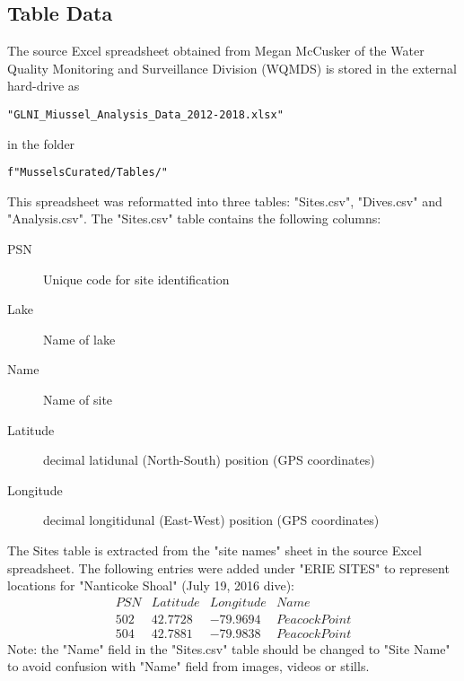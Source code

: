 \documentclass[11pt]{article} %
\begin{document}
\subsection{Table Data}

The source Excel spreadsheet obtained from Megan McCusker of the Water Quality Monitoring and Surveillance Division (WQMDS) is stored in the external hard-drive as 
\begin{verbatim}
"GLNI_Miussel_Analysis_Data_2012-2018.xlsx"
\end{verbatim}
in the folder
\begin{verbatim}
f"MusselsCurated/Tables/"
\end{verbatim}

This spreadsheet was reformatted into three tables: "Sites.csv", "Dives.csv" and "Analysis.csv". The "Sites.csv" table contains the following columns:
\begin{description}
\item[PSN] Unique code for site identification
\item[Lake] Name of lake
\item[Name] Name of site
\item[Latitude] decimal latidunal (North-South) position (GPS coordinates)
\item[Longitude] decimal longitidunal (East-West) position (GPS coordinates)
\end{description}
The Sites table is extracted from the "site names" sheet in the source Excel spreadsheet. The following entries were added under "ERIE SITES" to represent locations for "Nanticoke Shoal" (July 19, 2016 dive):
\[
\begin{array}{llll}
PSN & Latitude & Longitude & Name \\
502	& 42.7728 &	-79.9694	& Peacock Point\\
504	& 42.7881 &	-79.9838	& Peacock Point
\end{array}
\]
Note: the "Name" field in the "Sites.csv" table should be changed to "Site Name" to avoid confusion with "Name" field from images, videos or stills.
\end{document}
